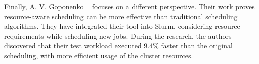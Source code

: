 Finally, A. V. Goponenko \etal~\cite{goponenko2020} focuses on a different perspective.
Their work proves resource-aware scheduling can be more effective than traditional scheduling algorithms.
They have integrated their tool into Slurm, considering resource requirements while scheduling new jobs.
During the research, the authors discovered that their test workload executed 9.4\% faster than the original scheduling, with more efficient usage of the cluster resources.
